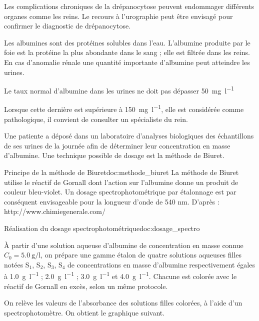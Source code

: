 \label{exo:albuminurie}

\medskip
\motsClesAlbuminurie
\medskip

Les complications chroniques de la drépanocytose peuvent endommager différents organes comme les reins.
Le recours à l’urographie peut être envisagé pour confirmer le diagnostic de drépanocytose.


Les albumines sont des protéines solubles dans l'eau.
L’albumine produite par le foie est la protéine la plus abondante dans le sang ; elle est filtrée dans les reins.
En cas d’anomalie rénale une quantité importante d’albumine peut atteindre les urines.
\begin{listePoints}
  \item Le taux normal d'albumine dans les urines ne doit pas dépasser \qty{50}{\mg\per\l}
  \item Lorsque cette dernière est supérieure à \qty{150}{\mg\per\l}, elle est considérée comme pathologique, il convient de consulter un spécialiste du rein.
\end{listePoints}
Une patiente a déposé dans un laboratoire d'analyses biologiques des échantillons de ses urines de la journée afin de déterminer leur concentration en masse d'albumine.
Une technique possible de dosage est la méthode de Biuret.


\begin{doc}{Principe de la méthode de Biuret}{doc:methode_biuret}
La méthode de Biuret utilise le réactif de Gornall dont l’action sur l’albumine donne un
produit de couleur bleu-violet. Un dosage spectrophotométrique par étalonnage est par
conséquent envisageable pour la longueur d’onde de 540 nm.
D’après : http://www.chimiegenerale.com/
\end{doc}

\begin{doc}{Réalisation du dosage spectrophotométrique}{doc:dosage_spectro}
  
  À partir d’une solution aqueuse d’albumine de concentration en masse connue 
  $C_0 = \qty{5,0}{\g\per\l}$,
  on prépare une gamme étalon de quatre solutions aqueuses filles notées S$_1$, S$_2$, S$_3$, S$_4$ de concentrations en masse d’albumine respectivement égales à
  \qty{1,0}{\g\per\l} ; \qty{2,0}{\g\per\l} ; \qty{3,0}{\g\per\l} et \qty{4,0}{\g\per\l}.
  Chacune est colorée avec le réactif de Gornall en excès, selon un même protocole.
  
  
  On relève les valeurs de l’absorbance des solutions filles colorées, à l’aide d’un
  spectrophotomètre. On obtient le graphique suivant.
  
\end{doc}

